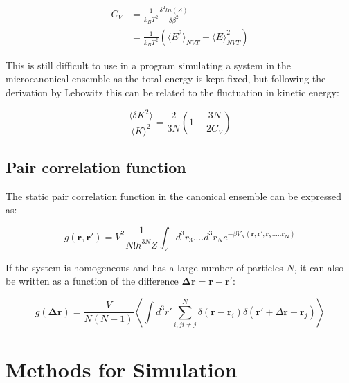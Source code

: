 \documentclass[
10pt, %
a4paper, %
oneside, %
headinclude,footinclude, %
BCOR5mm, %
]{scrartcl}
\begin{document}
\begin{align}
C_V &= \frac{1}{k_B T^2} \frac{\delta^2 ln(Z)}{\delta \beta^2} \\
&= \frac{1}{k_B T^2} \left ( \langle E^2\rangle_{NVT} - \langle E\rangle^2_{NVT} \right )
\end{align}

\noindent
This is still difficult to use in a program simulating a system in the microcanonical ensemble as the total energy is kept fixed, but following the derivation by Lebowitz\cite{Duane:1985lz} this can be related to the fluctuation in kinetic energy:

\begin{equation} \frac{\langle\delta K^2\rangle}{\langle K\rangle^2} = \frac{2}{3N} \left ( 1 - \frac{3N}{2C_V} \right ) \end{equation}



\subsection{Pair correlation function}

The static pair correlation function in the canonical ensemble can be expressed as:

\begin{equation} g(\mathbf{r,r'}) = V^2 \frac{1}{N!h^{3N}Z} \int_V d^3r_3....d^3r_N e^{-\beta V_N(\mathbf{r,r',r_3.....r_N})} \end{equation}

\noindent
If the system is homogeneous and has a large number of particles $N$, it can also be written as a function of the difference $\mathbf{\Delta r} = \mathbf{r} - \mathbf{r'}$:

\begin{equation} g(\mathbf{\Delta r}) = \frac{V}{N(N-1)}  \left \langle \int d^3r' \sum_{i,j i \neq j}^N \delta(\mathbf{r}-\mathbf{r}_i) \delta(\mathbf{r'} + \Delta\mathbf{r} - \mathbf{r}_j) \right \rangle \end{equation}

\newpage

\section{Methods for Simulation}
\end{document}
